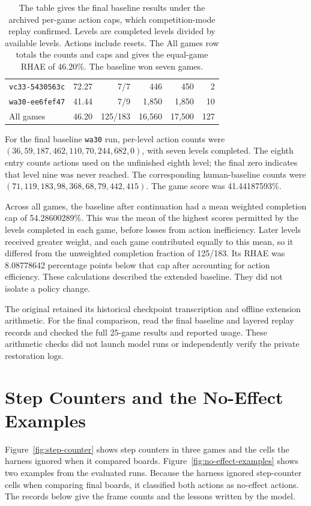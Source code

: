 \begin{table}[H]
\begin{tabular*}{\linewidth}{@{\extracolsep{\fill}}lrrrrr@{}}
\texttt{vc33-5430563c} & 72.27 & 7/7 & 446 & 450 & 2\\
\texttt{wa30-ee6fef47} & 41.44 & 7/9 & 1,850 & 1,850 & 10\\
\midrule
All games & 46.20 & 125/183 & 16,560 & 17,500 & 127\\\bottomrule
\end{tabular*}
\caption{The table gives the final baseline results under the archived per-game action caps, which competition-mode replay confirmed. Levels are completed levels divided by available levels. Actions include resets. The All games row totals the counts and caps and gives the equal-game RHAE of 46.20\%. The baseline won seven games.}\label{tab:continued-games}
\end{table}

For the final baseline \texttt{wa30} run, per-level action counts were $(36,59,187,462,110,70,244,682,0)$, with seven levels completed. The eighth entry counts actions used on the unfinished eighth level; the final zero indicates that level nine was never reached. The corresponding human-baseline counts were $(71,119,183,98,368,68,79,442,415)$. The game score was 41.44187593\%.

Across all games, the baseline after continuation had a mean weighted completion cap of 54.28600289\%. This was the mean of the highest scores permitted by the levels completed in each game, before losses from action inefficiency. Later levels received greater weight, and each game contributed equally to this mean, so it differed from the unweighted completion fraction of 125/183. Its RHAE was 8.08778642 percentage points below that cap after accounting for action efficiency. These calculations described the extended baseline. They did not isolate a policy change.

The original  retained its historical checkpoint transcription and offline extension arithmetic. For the final comparison,  read the final baseline and layered replay records and checked the full 25-game results and reported usage. These arithmetic checks did not launch model runs or independently verify the private restoration logs.


\section{Step Counters and the No-Effect Examples}\label{app:no-effect-traces}
Figure~\ref{fig:step-counter} shows step counters in three games and the cells the harness ignored when it compared boards. Figure~\ref{fig:no-effect-examples} shows two examples from the evaluated runs. Because the harness ignored step-counter cells when comparing final boards, it classified both actions as no-effect actions. The records below give the frame counts and the lessons written by the model.

